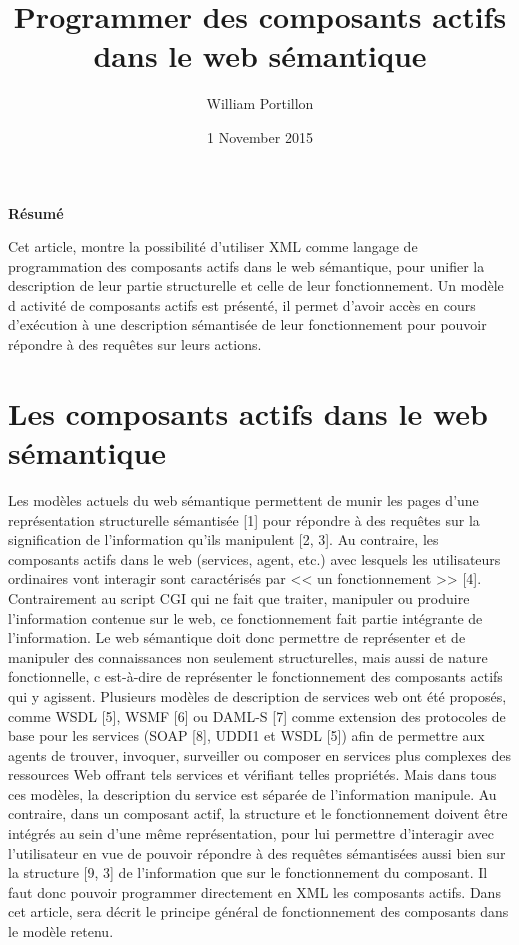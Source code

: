 \documentclass[]{article}
\title{Programmer des composants actifs dans le web sémantique}
\author{William Portillon}
\date{1 November 2015}
\begin{document}
\maketitle

\begin{center}
	\textbf{\large{Résumé}}
	
\end{center}

Cet article, montre la possibilité d'utiliser XML comme langage de programmation des composants actifs dans le web sémantique, pour unifier la description de leur partie structurelle et celle de leur fonctionnement. Un modèle d activité de composants actifs est présenté, il permet d'avoir accès en cours d'exécution  à une description sémantisée de leur fonctionnement pour pouvoir répondre à des requêtes sur leurs actions.

\section{Les composants actifs dans le web sémantique} 

Les modèles actuels du web sémantique permettent de munir les pages d'une représentation structurelle sémantisée [1] pour répondre à des requêtes sur la signification de l'information qu'ils manipulent [2, 3]. Au contraire, les composants actifs dans le web (services, agent, etc.) avec lesquels les utilisateurs ordinaires vont interagir sont caractérisés par << un fonctionnement >> [4]. Contrairement au  script CGI  qui ne fait que traiter, manipuler ou produire l'information contenue sur le web, ce fonctionnement fait partie intégrante de l'information. Le web sémantique doit donc permettre de représenter et de manipuler des connaissances non seulement structurelles, mais aussi de nature fonctionnelle, c est-à-dire de représenter le fonctionnement des composants actifs qui y agissent. Plusieurs modèles de description de services web ont été proposés, comme WSDL [5], WSMF [6] ou DAML-S [7] comme extension des protocoles de base pour les services (SOAP [8], UDDI1 et WSDL [5]) afin de permettre aux agents de trouver, invoquer, surveiller ou composer en services plus complexes des ressources Web offrant tels services et vérifiant telles propriétés. Mais dans tous ces modèles, la description du service est séparée de l'information manipule. Au contraire, dans un composant actif, la structure et le fonctionnement doivent être intégrés au sein d'une même représentation, pour lui permettre d'interagir avec l'utilisateur en vue de pouvoir répondre à des requêtes sémantisées aussi bien sur la structure [9, 3] de l'information que sur le fonctionnement  du composant. Il faut donc pouvoir programmer directement en XML les composants actifs. Dans cet article, sera décrit  le principe général de fonctionnement des composants dans le modèle retenu.
\end{document}
